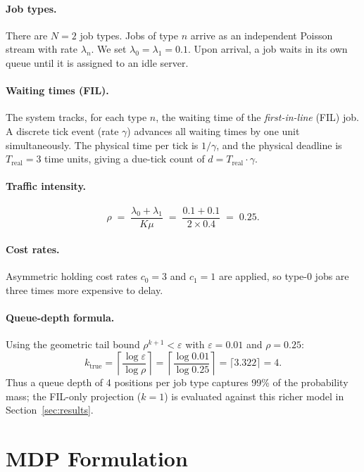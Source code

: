 \documentclass[11pt,a4paper]{article}
\begin{document}
\paragraph{Job types.}
There are $N = 2$ job types.  Jobs of type $n$ arrive as an independent
Poisson stream with rate $\lambda_n$.  We set $\lambda_0 = \lambda_1 = 0.1$.
Upon arrival, a job waits in its own queue until it is assigned to an idle
server.

\paragraph{Waiting times (FIL).}
The system tracks, for each type $n$, the waiting time of the
\emph{first-in-line} (FIL) job.  A discrete tick event (rate $\gamma$) advances
all waiting times by one unit simultaneously.  The physical time per tick is
$1/\gamma$, and the physical deadline is $T_\text{real} = 3$ time units, giving
a due-tick count of $d = T_\text{real} \cdot \gamma$.

\paragraph{Traffic intensity.}
\[
  \rho \;=\; \frac{\lambda_0 + \lambda_1}{K\mu}
          \;=\; \frac{0.1 + 0.1}{2 \times 0.4}
          \;=\; 0.25.
\]

\paragraph{Cost rates.}
Asymmetric holding cost rates $c_0 = 3$ and $c_1 = 1$ are applied, so
type-0 jobs are three times more expensive to delay.

\paragraph{Queue-depth formula.}
Using the geometric tail bound $\rho^{k+1} < \varepsilon$ with
$\varepsilon = 0.01$ and $\rho = 0.25$:
\[
  k_\text{true}
    = \left\lceil \frac{\log \varepsilon}{\log \rho} \right\rceil
    = \left\lceil \frac{\log 0.01}{\log 0.25} \right\rceil
    = \lceil 3.322 \rceil = 4.
\]
Thus a queue depth of 4 positions per job type captures 99\% of the
probability mass; the FIL-only projection ($k=1$) is evaluated against this
richer model in Section~\ref{sec:results}.


\section{MDP Formulation}
\label{sec:mdp}
\end{document}
